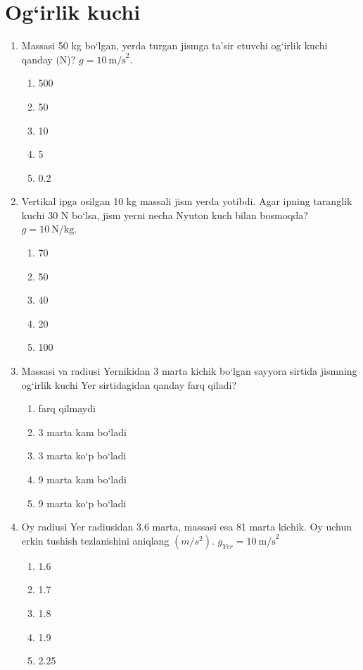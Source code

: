 \section{Og‘irlik kuchi}

\begin{enumerate}

\item Massasi 50 kg bo‘lgan, yerda turgan jismga ta’sir etuvchi og‘irlik kuchi qanday (N)? 
$g = 10\ \text{m/s}^2$.

\begin{enumerate}[label=\Alph*)]
\item 500
\item 50
\item 10
\item 5
\item 0.2
\end{enumerate}


\item Vertikal ipga osilgan 10 kg massali jism yerda yotibdi. 
Agar ipning taranglik kuchi 30 N bo‘lsa, jism yerni necha Nyuton kuch bilan bosmoqda? 
$g = 10\ \text{N/kg}$.

\begin{enumerate}[label=\Alph*)]
\item 70
\item 50
\item 40
\item 20
\item 100
\end{enumerate}


\item Massasi va radiusi Yernikidan 3 marta kichik bo‘lgan sayyora sirtida jismning og‘irlik kuchi 
Yer sirtidagidan qanday farq qiladi?

\begin{enumerate}[label=\Alph*)]
\item farq qilmaydi
\item 3 marta kam bo‘ladi
\item 3 marta ko‘p bo‘ladi
\item 9 marta kam bo‘ladi
\item 9 marta ko‘p bo‘ladi
\end{enumerate}


\item Oy radiusi Yer radiusidan 3.6 marta, massasi esa 81 marta kichik. Oy uchun erkin tushish tezlanishini aniqlang $(m/s^2)$. $g_{Yer}=10\ \text{m/s}^2$

\begin{enumerate}[label=\Alph*)]
\item 1.6
\item 1.7
\item 1.8
\item 1.9
\item 2.25
\end{enumerate}



\end{enumerate}
